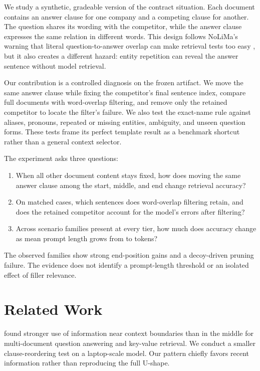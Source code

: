 \documentclass{article}
\begin{document}
We study a synthetic, gradeable version of the contract situation. Each document contains an answer clause for one company and a competing clause for another. The question shares its wording with the competitor, while the answer clause expresses the same relation in different words. This design follows NoLiMa's warning that literal question-to-answer overlap can make retrieval tests too easy \citep{modarressi2025nolima}, but it also creates a different hazard: entity repetition can reveal the answer sentence without model retrieval.

Our contribution is a controlled diagnosis on the frozen \modelName{} artifact. We move the same answer clause while fixing the competitor's final sentence index, compare full documents with word-overlap filtering, and remove only the retained competitor to locate the filter's failure. We also test the exact-name rule against aliases, pronouns, repeated or missing entities, ambiguity, and unseen question forms. These tests frame its perfect template result as a benchmark shortcut rather than a general context selector.

The experiment asks three questions:
\begin{enumerate}
    \item When all other document content stays fixed, how does moving the same answer clause among the start, middle, and end change retrieval accuracy?
    \item On matched cases, which sentences does word-overlap filtering retain, and does the retained competitor account for the model's errors after filtering?
    \item Across scenario families present at every tier, how much does accuracy change as mean prompt length grows from \tierTwoTokens{} to \tierEightTokens{} tokens?
\end{enumerate}

The observed families show strong end-position gains and a decoy-driven pruning failure. The evidence does not identify a prompt-length threshold or an isolated effect of filler relevance.

\section{Related Work}

\citet{liu2023lost} found stronger use of information near context boundaries than in the middle for multi-document question answering and key-value retrieval. We conduct a smaller clause-reordering test on a laptop-scale model. Our pattern chiefly favors recent information rather than reproducing the full U-shape.
\end{document}
